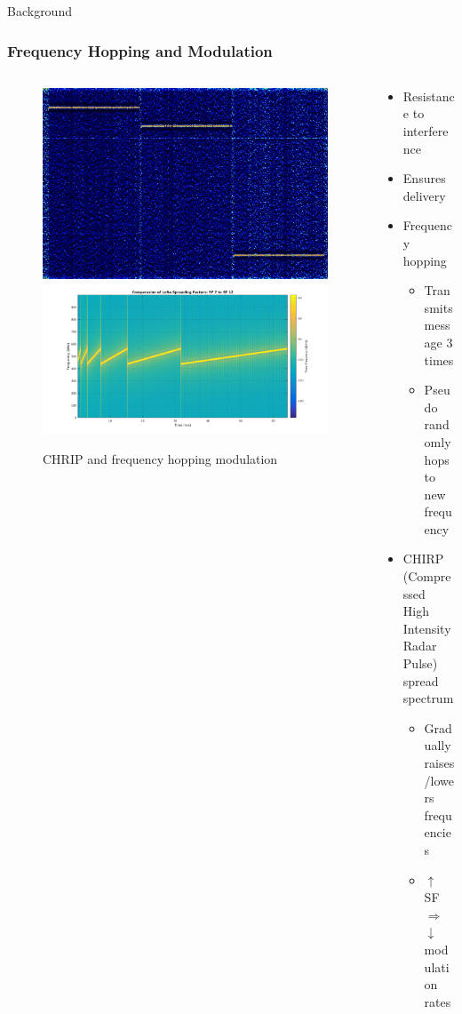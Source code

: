 \documentclass{beamer}
\begin{document}
\begin{frame}{Background}
  \frametitle{Frequency Hopping and Modulation}
  \begin{columns}
    \begin{column}{0.5\textwidth}
      \begin{figure}[htbp]
        \centering
        \includegraphics[width=.7\textwidth]{images/Sigfox_Spectrum_Analysis.jpg}
        \includegraphics[width=.9\textwidth]{images/Chirp.png}
        \caption{CHRIP and frequency hopping modulation}
        \label{fig:Frequency_hopping_and_modulation}
      \end{figure}
  \end{column}
    \begin{column}{0.5\textwidth}
      \begin{itemize}
        \item Resistance to interference
        \item Ensures delivery
        \item Frequency hopping
          \begin{itemize}
            \item Transmits message 3 times
            \item Pseudo randomly hops to new frequency
          \end{itemize}
        \item CHIRP (Compressed High Intensity Radar Pulse) spread spectrum
          \begin{itemize}
            \item Gradually raises/lowers frequencies
            \item $\uparrow$ SF $\Rightarrow$ $\downarrow$ modulation rates
          \end{itemize}
      \end{itemize}
    \end{column}
  \end{columns}
\end{frame}
\end{document}
